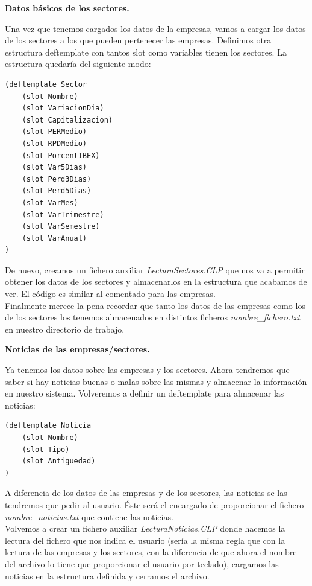 \documentclass[12pt]{article}
\begin{document}
\begin{center}
	\textbf{Datos básicos de los sectores.}
\end{center}
Una vez que tenemos cargados los datos de la empresas, vamos a cargar los datos de los sectores a los que pueden pertenecer las empresas. Definimos otra estructura deftemplate con tantos slot como variables tienen los sectores. La estructura quedaría del siguiente modo:
\begin{lstlisting}
(deftemplate Sector
	(slot Nombre)
	(slot VariacionDia)
	(slot Capitalizacion)
	(slot PERMedio)
	(slot RPDMedio)
	(slot PorcentIBEX)
	(slot Var5Dias)
	(slot Perd3Dias)
	(slot Perd5Dias)
	(slot VarMes)	
	(slot VarTrimestre)
	(slot VarSemestre)
	(slot VarAnual)
)
\end{lstlisting}
De nuevo, creamos un fichero auxiliar \textit{LecturaSectores.CLP} que nos va a permitir obtener los datos de los sectores y almacenarlos en la estructura que acabamos de ver. El código es similar al comentado para las empresas. \\
Finalmente merece la pena recordar que tanto los datos de las empresas como los de los sectores los tenemos almacenados en distintos ficheros \textit{nombre\_fichero.txt} en nuestro directorio de trabajo.

\begin{center}
	\textbf{Noticias de las empresas/sectores.}
\end{center}
Ya tenemos los datos sobre las empresas y los sectores. Ahora tendremos que saber si hay noticias buenas o malas sobre las mismas y almacenar la información en nuestro sistema. Volveremos a definir un deftemplate para almacenar las noticias:
\begin{lstlisting}
(deftemplate Noticia
	(slot Nombre)
	(slot Tipo)
	(slot Antiguedad)
)
\end{lstlisting}
A diferencia de los datos de las empresas y de los sectores, las noticias se las tendremos que pedir al usuario. Éste será el encargado de proporcionar el fichero \textit{nombre\_noticias.txt} que contiene las noticias. \\
Volvemos a crear un fichero auxiliar \textit{LecturaNoticias.CLP} donde hacemos la lectura del fichero que nos indica el usuario (sería la misma regla que con la lectura de las empresas y los sectores, con la diferencia de que ahora el nombre del archivo lo tiene que proporcionar el usuario por teclado), cargamos las noticias en la estructura definida y cerramos el archivo. 
\end{document}
